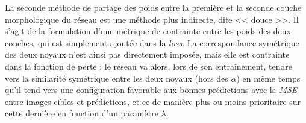 \vspace{-1.6mm}
\noindent La seconde méthode de partage des poids entre la première et la seconde couche morphologique du réseau est une méthode plus indirecte, dite << douce >>. Il s'agit de la formulation d'une métrique de contrainte entre les poids des deux couches, qui est simplement ajoutée dans la \textit{loss}. La correspondance symétrique des deux noyaux n'est ainsi pas directement imposée, mais elle est contrainte dans la fonction de perte : le réseau va alors, lors de son entraînement, tendre vers la similarité symétrique entre les deux noyaux (hors des $\alpha$) en même temps qu'il tend vers une configuration favorable aux bonnes prédictions avec la \textit{MSE} entre images cibles et prédictions, et ce de manière plus ou moins prioritaire sur cette dernière en fonction d'un paramètre $\lambda$. %



